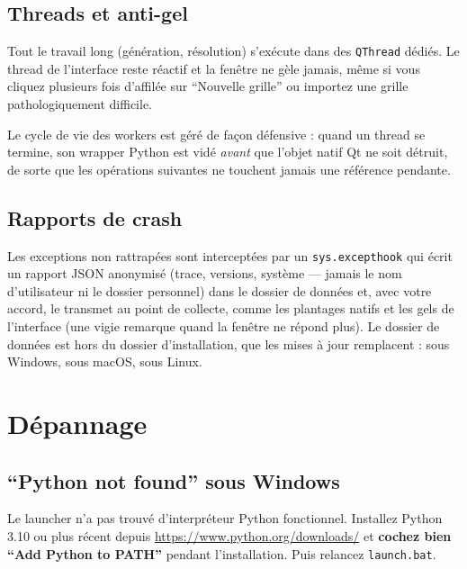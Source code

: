 \subsection{Threads et anti-gel}

Tout le travail long (génération, résolution) s'exécute dans des
\texttt{QThread} dédiés. Le thread de l'interface reste réactif et la
fenêtre ne gèle jamais, même si vous cliquez plusieurs fois d'affilée
sur ``Nouvelle grille'' ou importez une grille pathologiquement
difficile.

Le cycle de vie des workers est géré de façon défensive : quand un
thread se termine, son wrapper Python est vidé \emph{avant} que l'objet
natif Qt ne soit détruit, de sorte que les opérations suivantes ne
touchent jamais une référence pendante.

\subsection{Rapports de crash}

Les exceptions non rattrapées sont interceptées par un \texttt{sys.excepthook}
qui écrit un rapport JSON anonymisé (trace, versions, système --- jamais le
nom d'utilisateur ni le dossier personnel) dans le dossier de données et,
avec votre accord, le transmet au point de collecte, comme les plantages
natifs et les gels de l'interface (une vigie remarque quand la fenêtre ne
répond plus). Le dossier de données est hors du dossier d'installation, que
les mises à jour remplacent :
 sous Windows,
 sous macOS,
 sous Linux.

\section{Dépannage}

\subsection{``Python not found'' sous Windows}

Le launcher n'a pas trouvé d'interpréteur Python fonctionnel. Installez
Python 3.10 ou plus récent depuis
\url{https://www.python.org/downloads/} et \textbf{cochez bien
``Add Python to PATH''} pendant l'installation. Puis relancez
\texttt{launch.bat}.

